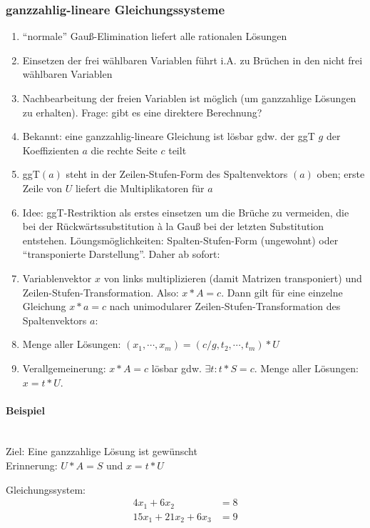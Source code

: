 \subsubsection{ganzzahlig-lineare Gleichungssysteme}
\begin{enumerate}
	\item ``normale'' Gauß-Elimination liefert alle rationalen Lösungen
	\item Einsetzen der frei wählbaren Variablen führt i.A. zu Brüchen in den nicht frei wählbaren Variablen
	\item Nachbearbeitung der freien Variablen ist möglich (um ganzzahlige Lösungen zu erhalten).
		Frage: gibt es eine direktere Berechnung?
	\item Bekannt: eine ganzzahlig-lineare Gleichung ist lösbar gdw. der ggT $g$ der Koeffizienten $a$ die rechte Seite $c$ teilt
	\item ggT$(a)$ steht in der Zeilen-Stufen-Form des Spaltenvektors $(a)$ oben; erste Zeile von $U$ liefert die Multiplikatoren für $a$
	\item Idee: ggT-Restriktion als erstes einsetzen um die Brüche zu vermeiden,
		die bei der Rückwärtssubstitution \`a la Gauß bei der letzten Substitution entstehen.
		Löungsmöglichkeiten: Spalten-Stufen-Form (ungewohnt) oder ``transponierte Darstellung''.
		Daher ab sofort:
	\item Variablenvektor $x$ von links multiplizieren (damit Matrizen transponiert) und Zeilen-Stufen-Transformation.
		Also: $x*A = c$. Dann gilt für eine einzelne Gleichung $x*a=c$ nach unimodularer Zeilen-Stufen-Transformation des Spaltenvektors $a$:
	\item Menge aller Lösungen: $(x_1,\cdots,x_m) = (c/g,t_2,\cdots,t_m)* U$
	\item Verallgemeinerung: $x*A = c$ lösbar gdw. $\exists t: t*S = c$. Menge aller Lösungen: $x = t*U$.
\end{enumerate}


\paragraph{Beispiel}~\\
Ziel: Eine ganzzahlige Lösung ist gewünscht~\\
Erinnerung: $U*A = S$ und $x = t*U$

Gleichungssystem:
\begin{align*}
  4x_1 +  6x_2         & = 8 \\
  15x_1 + 21x_2 + 6x_3 & = 9
\end{align*}


